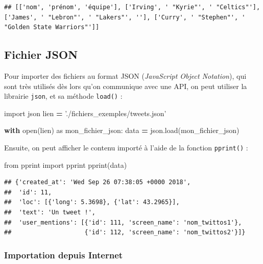 \documentclass[12pt,]{book}
\newenvironment{Shaded}{\begin{snugshade}}{\end{snugshade}}
\newcommand{\StringTok}[1]{\textcolor[rgb]{0.31,0.60,0.02}{#1}}
\newcommand{\ImportTok}[1]{#1}
\newcommand{\ControlFlowTok}[1]{\textcolor[rgb]{0.13,0.29,0.53}{\textbf{#1}}}
\newcommand{\OperatorTok}[1]{\textcolor[rgb]{0.81,0.36,0.00}{\textbf{#1}}}
\newcommand{\BuiltInTok}[1]{#1}
\newcommand{\NormalTok}[1]{#1}
\numberwithin{equation}{section}
\numberwithin{countremarque}{section}
\begin{document}
\begin{lstlisting}
## [['nom', 'prénom', 'équipe'], ['Irving', ' "Kyrie"', ' "Celtics"'], ['James', ' "Lebron"', ' "Lakers"', ''], ['Curry', ' "Stephen"', ' "Golden State Warriors"']]
\end{lstlisting}

\subsection{Fichier JSON}\label{fichier-json}

Pour importer des fichiers au format JSON (\emph{JavaScript Object
Notation}), qui sont très utilisés dès lors qu'on communique avec une
API, on peut utiliser la librairie \texttt{json}, et sa méthode
\texttt{load()} :

\begin{Shaded}
\begin{Highlighting}[]
\ImportTok{import}\NormalTok{ json}
\NormalTok{lien }\OperatorTok{=} \StringTok{'./fichiers_exemples/tweets.json'}

\ControlFlowTok{with} \BuiltInTok{open}\NormalTok{(lien) }\ImportTok{as}\NormalTok{ mon_fichier_json:}
\NormalTok{    data }\OperatorTok{=}\NormalTok{ json.load(mon_fichier_json)}
\end{Highlighting}
\end{Shaded}

Ensuite, on peut afficher le contenu importé à l'aide de la fonction
\texttt{pprint()} :

\begin{Shaded}
\begin{Highlighting}[]
\ImportTok{from}\NormalTok{ pprint }\ImportTok{import}\NormalTok{ pprint}
\NormalTok{pprint(data)}
\end{Highlighting}
\end{Shaded}

\begin{lstlisting}
## {'created_at': 'Wed Sep 26 07:38:05 +0000 2018',
##  'id': 11,
##  'loc': [{'long': 5.3698}, {'lat': 43.2965}],
##  'text': 'Un tweet !',
##  'user_mentions': [{'id': 111, 'screen_name': 'nom_twittos1'},
##                    {'id': 112, 'screen_name': 'nom_twittos2'}]}
\end{lstlisting}

\subsubsection{Importation depuis
Internet}\label{importation-depuis-internet-2}
\end{document}
